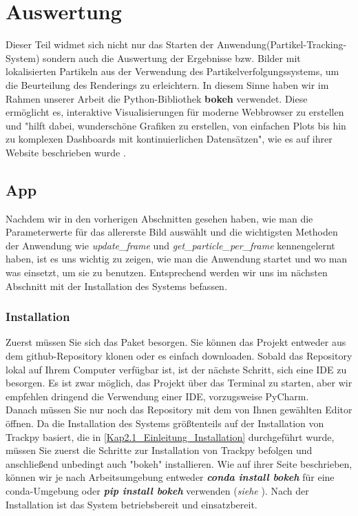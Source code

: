 \chapter{Auswertung}
Dieser Teil widmet sich nicht nur das Starten der Anwendung(Partikel-Tracking-System) sondern auch die Auswertung der Ergebnisse bzw. Bilder mit lokalisierten Partikeln aus der Verwendung des Partikelverfolgungssystems, um die Beurteilung des Renderings zu erleichtern.
In diesem Sinne haben wir im Rahmen unserer Arbeit die Python-Bibliothek \textbf{bokeh} verwendet. Diese ermöglicht es, interaktive Visualisierungen für moderne Webbrowser zu erstellen und "hilft dabei, wunderschöne Grafiken zu erstellen, von einfachen Plots bis hin zu komplexen Dashboards mit kontinuierlichen Datensätzen", wie es auf ihrer Website beschrieben wurde \cite{bokeh}.

\section{App}
Nachdem wir in den vorherigen Abschnitten gesehen haben, wie man die Parameterwerte für das allererste Bild auswählt und die wichtigsten Methoden der Anwendung wie \textit{update\_frame} und \textit{get\_particle\_per\_frame} kennengelernt haben, ist es uns wichtig zu zeigen, wie man die Anwendung startet und wo man was einsetzt, um sie zu benutzen.
Entsprechend werden wir uns im nächsten Abschnitt mit der Installation des Systems befassen.

\subsection{Installation}
Zuerst müssen Sie sich das Paket besorgen. Sie können das Projekt entweder aus dem github-Repository \cite{particleTrackingSystem} klonen oder es einfach downloaden. Sobald das Repository lokal auf Ihrem Computer verfügbar ist, ist der nächste Schritt, sich eine IDE zu besorgen. Es ist zwar möglich, das Projekt über das Terminal zu starten, aber wir empfehlen dringend die Verwendung einer IDE, vorzugsweise PyCharm.\\
Danach müssen Sie nur noch das Repository mit dem von Ihnen gewählten Editor öffnen.  
Da die Installation des Systems größtenteils auf der Installation von Trackpy basiert, die in \ref{Kap2.1_Einleitung_Installation} durchgeführt wurde, müssen Sie zuerst die Schritte zur Installation von Trackpy befolgen und anschließend unbedingt auch "bokeh" installieren.   
Wie auf ihrer Seite beschrieben, können wir je nach Arbeitsumgebung entweder \textsl{\textbf{conda install bokeh}} für eine conda-Umgebung oder \textsl{\textbf{pip install bokeh}} verwenden (\textit{siehe} \cite{bokeh}).
Nach der Installation ist das System betriebsbereit und einsatzbereit.

